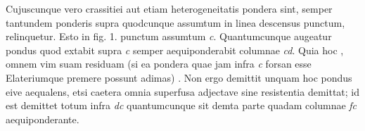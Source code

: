                         \pstart[113 v\textsuperscript{o}]   Cujuscunque vero crassitiei aut etiam heterogeneitatis pondera sint, semper tantundem ponderis supra quodcunque assumtum in linea descensus punctum, relinquetur. Esto in fig. 1. punctum assumtum \textit{c}. Quantumcunque augeatur pondus quod extabit supra \textit{c} 
 semper aequiponderabit columnae \textit{cd}. Quia hoc , omnem vim suam residuam (si  ea pondera quae jam infra \textit{c} forsan esse Elateriumque\protect{} premere possunt adimas) . Non ergo demittit unquam hoc pondus eive aequalens, etsi caetera omnia superfusa adjectave sine resistentia demittat; id est demittet totum infra \textit{dc} quantumcunque sit demta  parte quadam columnae \textit{fc} aequiponderante.
